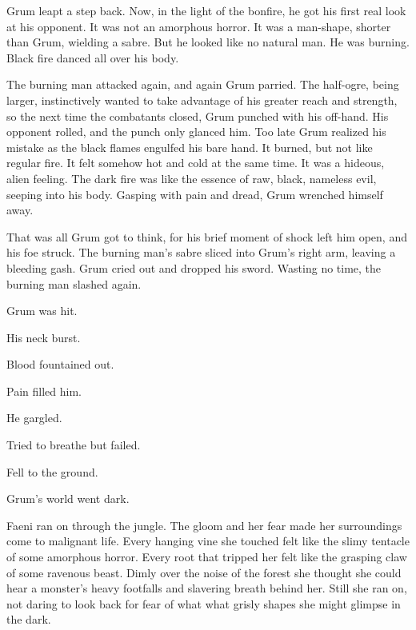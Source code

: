 Grum leapt a step back. 
Now, in the light of the bonfire, he got his first real look at his opponent.
It was not an amorphous horror. 
It was a man-shape, shorter than Grum, wielding a sabre. 
But he looked like no natural man. 
He was burning.
Black fire danced all over his body. 

The burning man attacked again, and again Grum parried. 
The half-ogre, being larger, instinctively wanted to take advantage of his greater reach and strength, so the next time the combatants closed, Grum punched with his off-hand. 
His opponent rolled, and the punch only glanced him.
Too late Grum realized his mistake as the black flames engulfed his bare hand. 
It burned, but not like regular fire.
It felt somehow hot and cold at the same time. 
It was a hideous, alien feeling. 
The dark fire was like the essence of raw, black, nameless evil, seeping into his body. 
Gasping with pain and dread, Grum wrenched himself away.


That was all Grum got to think, for his brief moment of shock left him open, and his foe struck. 
The burning man's sabre sliced into Grum's right arm, leaving a bleeding gash. 
Grum cried out and dropped his sword. 
Wasting no time, the burning man slashed again. 

Grum was hit. 

His neck burst. 

Blood fountained out. 

Pain filled him.

He gargled.

Tried to breathe but failed.

Fell to the ground. 

Grum's world went dark. 



\begin{comment}
  \subsection{Faeni raped}
\end{comment}
\new 
Faeni ran on through the jungle.
The gloom and her fear made her surroundings come to malignant life. 
Every hanging vine she touched felt like the slimy tentacle of some amorphous horror.
Every root that tripped her felt like the grasping claw of some ravenous beast.
Dimly over the noise of the forest she thought she could hear a monster's heavy footfalls and slavering breath behind her. 
Still she ran on, not daring to look back for fear of what what grisly shapes she might glimpse in the dark. 

